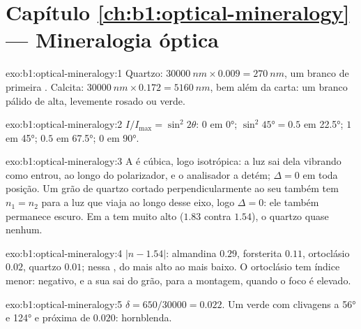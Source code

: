 \section*{Capítulo \ref{ch:b1:optical-mineralogy} --- Mineralogia óptica}

\begin{solution}{exo:b1:optical-mineralogy:1}
Quartzo: $\qty{30000}{nm}\times0.009 = \qty{270}{nm}$, um branco de primeira .
Calcita: $\qty{30000}{nm}\times0.172 = \qty{5160}{nm}$, bem além da carta:
um branco pálido de  alta, levemente rosado ou verde.
\end{solution}

\begin{solution}{exo:b1:optical-mineralogy:2}
$I/I_{\max} = \sin^2 2\theta$: $0$ em \ang{0}; $\sin^2\ang{45} = 0.5$ em
\ang{22.5}; $1$ em \ang{45}; $0.5$ em \ang{67.5}; $0$ em \ang{90}.
\end{solution}

\begin{solution}{exo:b1:optical-mineralogy:3}
A  é cúbica, logo isotrópica: a luz sai dela vibrando como entrou,
ao longo do polarizador, e o analisador a detém; $\Delta = 0$ em toda posição. Um grão de quartzo cortado perpendicularmente ao seu  também tem
$n_1 = n_2$ para a luz que viaja ao longo desse eixo, logo $\Delta = 0$: ele também permanece escuro. Em  a  tem  muito alto ($1.83$
contra $1.54$), o quartzo quase nenhum.
\end{solution}

\begin{solution}{exo:b1:optical-mineralogy:4}
$|n - 1.54|$: almandina $0.29$, forsterita $0.11$, ortoclásio $0.02$, quartzo
$0.01$;  nessa , do mais alto ao mais baixo. O ortoclásio tem índice menor:  negativo, e a sua  sai do grão, para a montagem, quando o foco é elevado.
\end{solution}

\begin{solution}{exo:b1:optical-mineralogy:5}
$\delta = 650/30000 = 0.022$. Um  verde  com clivagens a \ang{56} e \ang{124} e  próxima de $0.020$: hornblenda.
\end{solution}

